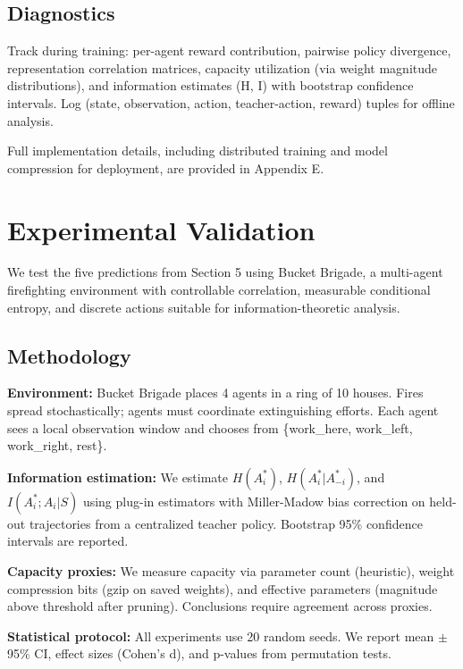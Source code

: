 \documentclass[10pt, letterpaper]{article}
\begin{document}
\subsection{Diagnostics}

Track during training: per-agent reward contribution, pairwise policy divergence, representation correlation matrices, capacity utilization (via weight magnitude distributions), and information estimates (H, I) with bootstrap confidence intervals. Log (state, observation, action, teacher-action, reward) tuples for offline analysis.

Full implementation details, including distributed training and model compression for deployment, are provided in Appendix E.

\section{Experimental Validation}
\label{sec:experiments}

We test the five predictions from Section 5 using Bucket Brigade, a multi-agent firefighting environment with controllable correlation, measurable conditional entropy, and discrete actions suitable for information-theoretic analysis.

\subsection{Methodology}

\textbf{Environment:} Bucket Brigade places 4 agents in a ring of 10 houses. Fires spread stochastically; agents must coordinate extinguishing efforts. Each agent sees a local observation window and chooses from \{work\_here, work\_left, work\_right, rest\}.

\textbf{Information estimation:} We estimate $H(A_i^*)$, $H(A_i^*|A_{-i}^*)$, and $I(A_i^*; A_i|S)$ using plug-in estimators with Miller-Madow bias correction on held-out trajectories from a centralized teacher policy. Bootstrap 95\% confidence intervals are reported.

\textbf{Capacity proxies:} We measure capacity via parameter count (heuristic), weight compression bits (gzip on saved weights), and effective parameters (magnitude above threshold after pruning). Conclusions require agreement across proxies.

\textbf{Statistical protocol:} All experiments use 20 random seeds. We report mean $\pm$ 95\% CI, effect sizes (Cohen's d), and p-values from permutation tests.
\end{document}
